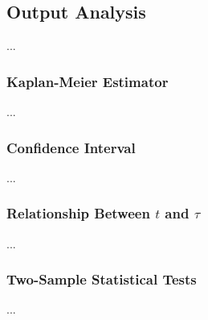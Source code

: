 \subsection{Output Analysis}


...



\subsubsection{Kaplan-Meier Estimator}


...


\subsubsection{Confidence Interval}


...


\subsubsection{Relationship Between $t$ and $\tau$}


...


\subsubsection{Two-Sample Statistical Tests}

...

